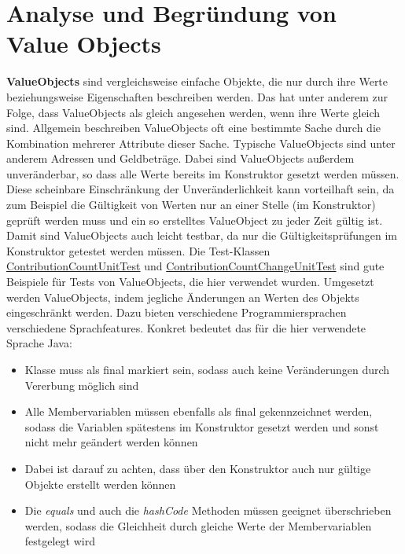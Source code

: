 \newpage

\section{Analyse und Begründung von Value Objects}

\textbf{ValueObjects} sind vergleichsweise einfache Objekte, die nur durch ihre Werte beziehungsweise Eigenschaften beschreiben werden.
Das hat unter anderem zur Folge, dass ValueObjects als gleich angesehen werden, wenn ihre Werte gleich sind.
Allgemein beschreiben ValueObjects oft eine bestimmte Sache durch die Kombination mehrerer Attribute dieser Sache. Typische ValueObjects sind unter anderem Adressen und Geldbeträge.
Dabei sind ValueObjects außerdem unveränderbar, so dass alle Werte bereits im Konstruktor gesetzt werden müssen.
Diese scheinbare Einschränkung der Unveränderlichkeit kann vorteilhaft sein, da zum Beispiel die Gültigkeit von Werten nur an einer Stelle (im Konstruktor) geprüft werden muss und ein so erstelltes ValueObject zu jeder Zeit gültig ist. Damit sind ValueObjects auch leicht testbar, da nur die Gültigkeitsprüfungen im Konstruktor getestet werden müssen. 
Die Test-Klassen \href{https://github.com/lukaspanni/OpenSourceStats/blob/main/app/src/test/java/de/lukaspanni/opensourcestats/ContributionCountUnitTest.java}{ContributionCountUnitTest} und \href{https://github.com/lukaspanni/OpenSourceStats/blob/main/app/src/test/java/de/lukaspanni/opensourcestats/ContributionCountChangeUnitTest.java}{ContributionCountChangeUnitTest} sind gute Beispiele für Tests von ValueObjects, die hier verwendet wurden.
\newline
Umgesetzt werden ValueObjects, indem jegliche Änderungen an Werten des Objekts eingeschränkt werden. Dazu bieten verschiedene Programmiersprachen verschiedene Sprachfeatures.
\newline
Konkret bedeutet das für die hier verwendete Sprache Java:
\begin{itemize}
\item{Klasse muss als final markiert sein, sodass auch keine Veränderungen durch Vererbung möglich sind}
\item{Alle Membervariablen müssen ebenfalls als final gekennzeichnet werden, sodass die Variablen spätestens im Konstruktor gesetzt werden und sonst nicht mehr geändert werden können}
\item{Dabei ist darauf zu achten, dass über den Konstruktor auch nur gültige Objekte erstellt werden können}
\item{Die \textit{equals} und auch die \textit{hashCode} Methoden müssen geeignet überschrieben werden, sodass die Gleichheit durch gleiche Werte der Membervariablen festgelegt wird}
\end{itemize}

